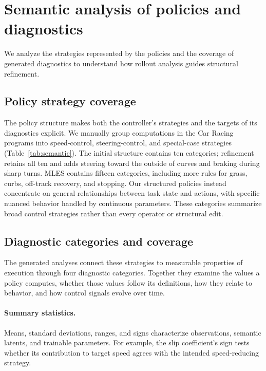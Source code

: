 \section{Semantic analysis of policies and diagnostics}
\label{app:extended}

We analyze the strategies represented by the policies and the coverage of generated diagnostics to understand how rollout analysis guides structural refinement.

\subsection{Policy strategy coverage}
\label{app:strategy-coverage}

The policy structure makes both the controller's strategies and the targets of its diagnostics explicit.
We manually group computations in the Car Racing programs into speed-control, steering-control, and special-case strategies (Table~\ref{tab:semantic}).
The initial structure contains ten categories; refinement retains all ten and adds steering toward the outside of curves and braking during sharp turns.
MLES contains fifteen categories, including more rules for grass, curbs, off-track recovery, and stopping.
Our structured policies instead concentrate on general relationships between task state and actions, with specific nuanced behavior handled by continuous parameters.
These categories summarize broad control strategies rather than every operator or structural edit.



\subsection{Diagnostic categories and coverage}
\label{app:coverage}

The generated analyses connect these strategies to measurable properties of execution through four diagnostic categories.
Together they examine the values a policy computes, whether those values follow its definitions, how they relate to behavior, and how control signals evolve over time.

\paragraph{Summary statistics.}
Means, standard deviations, ranges, and signs characterize observations, semantic latents, and trainable parameters.
For example, the slip coefficient's sign tests whether its contribution to target speed agrees with the intended speed-reducing strategy.


